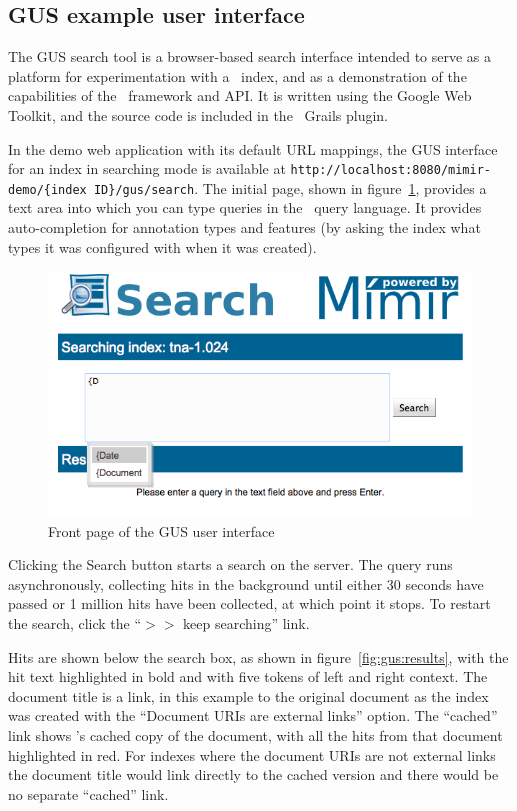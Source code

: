 \subsection{GUS example user interface}\label{sec:search:gus}

The GUS search tool is a browser-based search interface intended to serve as a
platform for experimentation with a \Mimir\ index, and as a demonstration of
the capabilities of the \Mimir\ framework and API.  It is written using the
Google Web Toolkit, and the source code is included in the \Mimir\ Grails
plugin.

In the demo web application with its default URL mappings, the GUS interface
for an index in searching mode is available at 
{\tt http://localhost:8080/mimir-demo/\{index ID\}/gus/search}.  The initial
page, shown in figure~\ref{fig:gus:front-page}, provides a text area into which
you can type queries in the \Mimir\ query language.  It provides
auto-completion for annotation types and features (by asking the index what
types it was configured with when it was created).

\begin{figure}[tbp]
\begin{center}
\includegraphics[scale=0.5]{img/gus-front-page}
\caption{Front page of the GUS user interface}
\label{fig:gus:front-page}
\end{center}
\end{figure}

Clicking the Search button starts a search on the server.  The query runs
asynchronously, collecting hits in the background until either 30 seconds have
passed or 1 million hits have been collected, at which point it stops.  To
restart the search, click the ``$>>$ keep searching'' link.

Hits are shown below the search box, as shown in figure~\ref{fig:gus:results},
with the hit text highlighted in bold and with five tokens of left and right
context.  The document title is a link, in this example to the original
document as the index was created with the ``Document URIs are external links''
option.  The ``cached'' link shows \Mimir's cached copy of the document, with
all the hits from that document highlighted in red.  For indexes where the
document URIs are not external links the document title would link directly to
the cached version and there would be no separate ``cached'' link.

